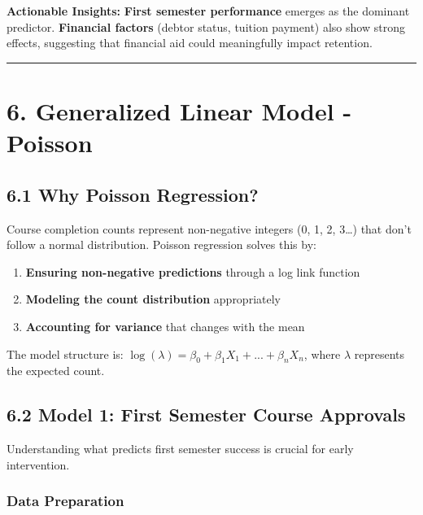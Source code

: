 \documentclass[
]{article}
\providecommand{\tightlist}{%
  \setlength{\itemsep}{0pt}\setlength{\parskip}{0pt}}
\begin{document}
\textbf{Actionable Insights:} \textbf{First semester performance}
emerges as the dominant predictor. \textbf{Financial factors} (debtor
status, tuition payment) also show strong effects, suggesting that
financial aid could meaningfully impact retention.

\begin{center}\rule{0.5\linewidth}{0.5pt}\end{center}

\section{6. Generalized Linear Model -
Poisson}\label{generalized-linear-model---poisson}

\subsection{6.1 Why Poisson Regression?}\label{why-poisson-regression}

Course completion counts represent non-negative integers (0, 1, 2,
3\ldots) that don't follow a normal distribution. Poisson regression
solves this by:

\begin{enumerate}
\def\labelenumi{\arabic{enumi}.}
\tightlist
\item
  \textbf{Ensuring non-negative predictions} through a log link function
\item
  \textbf{Modeling the count distribution} appropriately
\item
  \textbf{Accounting for variance} that changes with the mean
\end{enumerate}

The model structure is:
\(\log(\lambda) = \beta_0 + \beta_1X_1 + ... + \beta_nX_n\), where
\(\lambda\) represents the expected count.

\subsection{6.2 Model 1: First Semester Course
Approvals}\label{model-1-first-semester-course-approvals}

Understanding what predicts first semester success is crucial for early
intervention.

\subsubsection{Data Preparation}\label{data-preparation-1}
\end{document}
